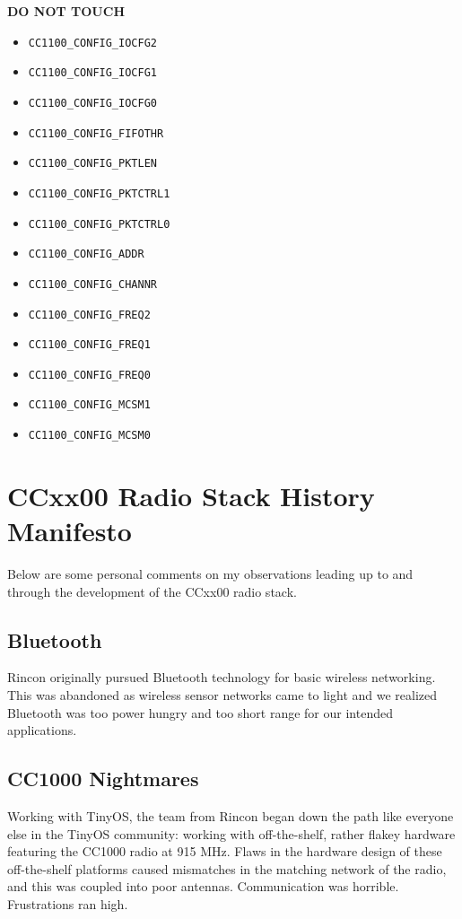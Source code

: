 \documentclass{article}
\begin{document}
\begin{center}
\textbf{DO NOT TOUCH}
\begin{itemize}
	\item \texttt{CC1100\_CONFIG\_IOCFG2}
	\item \texttt{CC1100\_CONFIG\_IOCFG1}
	\item \texttt{CC1100\_CONFIG\_IOCFG0}
	\item \texttt{CC1100\_CONFIG\_FIFOTHR}
	\item \texttt{CC1100\_CONFIG\_PKTLEN}
	\item \texttt{CC1100\_CONFIG\_PKTCTRL1}
	\item \texttt{CC1100\_CONFIG\_PKTCTRL0}
	\item \texttt{CC1100\_CONFIG\_ADDR}	
	\item \texttt{CC1100\_CONFIG\_CHANNR}
	\item \texttt{CC1100\_CONFIG\_FREQ2}
	\item \texttt{CC1100\_CONFIG\_FREQ1}
	\item \texttt{CC1100\_CONFIG\_FREQ0}
	\item \texttt{CC1100\_CONFIG\_MCSM1}
	\item \texttt{CC1100\_CONFIG\_MCSM0}
\end{itemize}
\end{center}

\section{CCxx00 Radio Stack History Manifesto}
\label{sec:manifesto}

Below are some personal comments on my observations leading up to and through the development
of the CCxx00 radio stack. 

\subsection{Bluetooth}
Rincon originally pursued Bluetooth technology for basic wireless networking.  This was
abandoned as wireless sensor networks came to light and we realized Bluetooth was too power
hungry and too short range for our intended applications.

\subsection{CC1000 Nightmares}
Working with TinyOS, the team from Rincon began down the path like everyone else in the TinyOS
community: working with off-the-shelf, rather flakey hardware featuring the 
CC1000 radio at 915 MHz. Flaws in the hardware design of these off-the-shelf platforms caused mismatches in
the matching network of the radio, and this was coupled into poor antennas. Communication was horrible.
Frustrations ran high.
\end{document}
